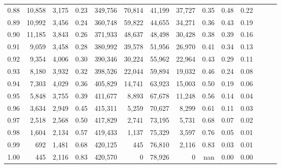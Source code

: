 \begin{tabular}{rrrrrrrrrrrrrr}
0.88 &  10,858 &  3,175 &  0.23 &  349,756 &   70,814 &  41,199 &  37,727 &  0.35 &  0.48 &      0.22 \\
0.89 &  10,992 &  3,456 &  0.24 &  360,748 &   59,822 &  44,655 &  34,271 &  0.36 &  0.43 &      0.19 \\
0.90 &  11,185 &  3,843 &  0.26 &  371,933 &   48,637 &  48,498 &  30,428 &  0.38 &  0.39 &      0.16 \\
0.91 &   9,059 &  3,458 &  0.28 &  380,992 &   39,578 &  51,956 &  26,970 &  0.41 &  0.34 &      0.13 \\
0.92 &   9,354 &  4,006 &  0.30 &  390,346 &   30,224 &  55,962 &  22,964 &  0.43 &  0.29 &      0.11 \\
0.93 &   8,180 &  3,932 &  0.32 &  398,526 &   22,044 &  59,894 &  19,032 &  0.46 &  0.24 &      0.08 \\
0.94 &   7,303 &  4,029 &  0.36 &  405,829 &   14,741 &  63,923 &  15,003 &  0.50 &  0.19 &      0.06 \\
0.95 &   5,848 &  3,755 &  0.39 &  411,677 &    8,893 &  67,678 &  11,248 &  0.56 &  0.14 &      0.04 \\
0.96 &   3,634 &  2,949 &  0.45 &  415,311 &    5,259 &  70,627 &   8,299 &  0.61 &  0.11 &      0.03 \\
0.97 &   2,518 &  2,568 &  0.50 &  417,829 &    2,741 &  73,195 &   5,731 &  0.68 &  0.07 &      0.02 \\
0.98 &   1,604 &  2,134 &  0.57 &  419,433 &    1,137 &  75,329 &   3,597 &  0.76 &  0.05 &      0.01 \\
0.99 &     692 &  1,481 &  0.68 &  420,125 &      445 &  76,810 &   2,116 &  0.83 &  0.03 &      0.01 \\
1.00 &     445 &  2,116 &  0.83 &  420,570 &        0 &  78,926 &       0 &   nan &  0.00 &      0.00 \\
\bottomrule
\end{tabular}
